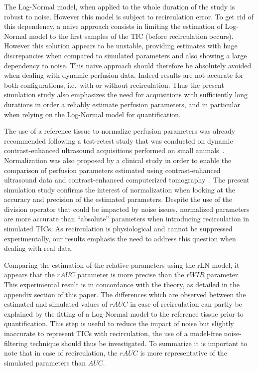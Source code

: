 The Log-Normal model, when applied to the whole duration of the study is robust to noise. However this model is subject to recirculation error. To get rid of this dependency, a naive approach consists in limiting the estimation of Log-Normal model to the first samples of the TIC (before recirculation occurs). However this solution appears to be unstable, providing estimates with huge discrepancies when compared to simulated parameters and also showing a large dependency to noise. This naive approach should therefore be absolutely avoided when dealing with dynamic perfusion data. Indeed results are not accurate for both configurations, i.e.~with or without recirculation. Thus the present simulation study also emphasizes the need for acquisitions with sufficiently long durations in order a reliably estimate perfusion parameters, and in particular when relying on the Log-Normal model for quantification. 

The use of a reference tissue to normalize perfusion parameters was already recommended following a test-retest study that was conducted on dynamic contrast-enhanced ultrasound acquisitions performed on small animals~\cite{Doury:2017fz}. Normalization was also proposed by a clinical study in order to enable the comparison of perfusion parameters estimated using contrast-enhanced ultrasound data and contrast-enhanced computerized tomography~\cite{Lefort2012}. The present simulation study confirms the interest of normalization when looking at the accuracy and precision of the estimated parameters. Despite the use of the division operator that could be impacted by noise issues, normalized parameters are more accurate than ``absolute'' parameters when introducing recirculation in simulated TICs. As recirculation is physiological and cannot be suppressed experimentally, our results emphasis the need to address this question when dealing with real data.

Comparing the estimation of the relative parameters using the rLN model, it appears that the $rAUC$ parameter is more precise than the $rWIR$ parameter. This experimental result is in concordance with the theory, as detailed in the appendix section of this paper. The differences which are observed between the estimated and simulated values of $rAUC$ in case of recirculation can partly be explained by the fitting of a Log-Normal model to the reference tissue prior to quantification. This step is useful to reduce the impact of noise but slightly inaccurate to represent TICs with recirculation, the use of a model-free noise-filtering technique should thus be investigated. To summarize it is important to note that in case of recirculation, the $rAUC$ is more representative of the simulated parameters than $AUC$.

